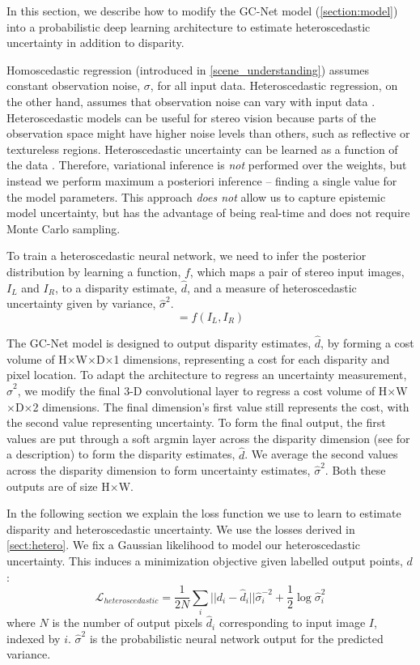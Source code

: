 In this section, we describe how to modify the GC-Net model (\cref{section:model}) into a probabilistic deep learning architecture to estimate heteroscedastic uncertainty in addition to disparity.

Homoscedastic regression (introduced in \cref{scene_understanding}) assumes constant observation noise, $\sigma$, for all input data. Heteroscedastic regression, on the other hand, assumes that observation noise can vary with input data \citep{nix1994estimating,le2005heteroscedastic}. Heteroscedastic models can be useful for stereo vision because parts of the observation space might have higher noise levels than others, such as reflective or textureless regions. Heteroscedastic uncertainty can be learned as a function of the data \citep{kendall2017uncertainties}. Therefore, variational inference is \textit{not} performed over the weights, but instead we perform maximum a posteriori inference -- finding a single value for the model parameters. This approach \textit{does not} allow us to capture epistemic model uncertainty, but has the advantage of being real-time and does not require Monte Carlo sampling.

To train a heteroscedastic neural network, we need to infer the posterior distribution by learning a function, $f$, which maps a pair of stereo input images, $I_{L}$ and $I_{R}$, to a disparity estimate, $\hat{d}$, and a measure of heteroscedastic uncertainty given by variance, $\hat{\sigma}^2$. 
\begin{equation}
[\hat{d}, \hat{\sigma}^2] = f(I_{L}, I_{R})
\end{equation}

The GC-Net model is designed to output disparity estimates, $\hat{d}$, by forming a cost volume of H$\times$W$\times$D$\times$1 dimensions, representing a cost for each disparity and pixel location. To adapt the architecture to regress an uncertainty measurement, $\hat{\sigma}^2$, we modify the final 3-D convolutional layer to regress a cost volume of H$\times$W$\times$D$\times$2 dimensions. The final dimension's first value still represents the cost, with the second value representing uncertainty. To form the final output, the first values are put through a soft argmin layer across the disparity dimension (see \citep{kendall2017end} for a description) to form the disparity estimates, $\hat{d}$. We average the second values across the disparity dimension to form uncertainty estimates, $\hat{\sigma}^2$. Both these outputs are of size H$\times$W.

In the following section we explain the loss function we use to learn to estimate disparity and heteroscedastic uncertainty. We use the losses derived in \cref{sect:hetero}. We fix a Gaussian likelihood to model our heteroscedastic uncertainty. This induces a minimization objective given labelled output points, $d$:
\begin{equation}
\mathcal{L}_{heteroscedastic} = \frac{1}{2N} \sum_i ||d_i-\hat{d}_i||\hat{\sigma}^{-2}_i + \frac{1}{2}\log{\hat{\sigma}^2_i}
\label{eqn:bayes_loss}
\end{equation}
where $N$ is the number of output pixels $\hat{d}_i$ corresponding to input image $I$, indexed by $i$. $\hat{\sigma}^2$ is the probabilistic neural network output for the predicted variance.


